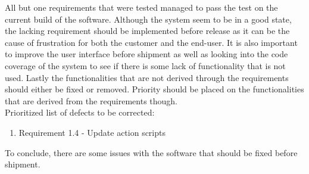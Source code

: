 All but one requirements that were tested managed to pass the test on the current build of the software. Although the system seem to be in a good state, the lacking requirement should be implemented before release as it can be the cause of frustration for both the customer and the end-user. It is also important to improve the user interface before shipment as well as looking into the code coverage of the system to see if there is some lack of functionality that is not used. Lastly the functionalities that are not derived through the requirements should either be fixed or removed. Priority should be placed on the functionalities that are derived from the requirements though. \\

\noindent Prioritized list  of defects to be corrected:

\begin{enumerate}
    \item Requirement 1.4 - Update action scripts 
\end{enumerate}

\noindent To conclude, there are some issues with the software that should be fixed before shipment. 

